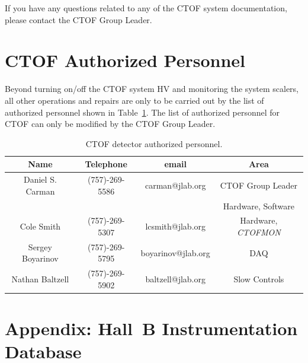 \documentclass[12pt]{article}
\begin{document}
If you have any questions related to any of the CTOF system documentation, please 
contact the CTOF Group Leader.

\section{CTOF Authorized Personnel}
\label{personnel}

Beyond turning on/off the CTOF system HV and monitoring the system scalers, all other 
operations and repairs are only to be carried out by the list of authorized personnel 
shown in Table~\ref{expert-list}. The list of authorized personnel for CTOF can only 
be modified by the CTOF Group Leader.

\begin{table}[htbp]
\begin{center}
\begin{tabular} {|c|c|c|c|} \hline
Name             & Telephone      & email              & Area             \\ \hline \hline
Daniel S. Carman & (757)-269-5586 & carman@jlab.org    & CTOF Group Leader\\
                 &                &                    & Hardware, Software \\ \hline
Cole Smith       & (757)-269-5307 & lcsmith@jlab.org   & Hardware, {\it CTOFMON} \\ \hline
Sergey Boyarinov & (757)-269-5795 & boyarinov@jlab.org & DAQ              \\ \hline
Nathan Baltzell  & (757)-269-5902 & baltzell@jlab.org  & Slow Controls    \\ \hline
\end{tabular}
\caption{CTOF detector authorized personnel.}
\label{expert-list}
\end{center}
\end{table}

\clearpage

\vfil
\eject

\section{Appendix: Hall~B Instrumentation Database}
\end{document}
